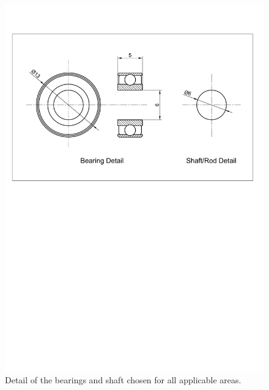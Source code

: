         \begin{figure}[H]
          \centering
          \includegraphics[clip, trim=2cm 16cm 2cm 3cm, width=0.7\linewidth]{figures/bearing-shaft-detail}
          \caption[Detail of the bearings and shaft chosen for all applicable areas.]{Detail of the bearings and shaft chosen for all applicable areas.}
          \label{fig:mechDesign-bearingShaftDetail}
        \end{figure}        
        
